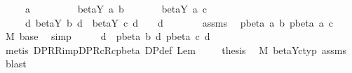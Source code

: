 \begin{isabellebody}
\ \ \ {\isachardoublequoteopen}{\isasymGamma}\ {\isasymturnstile}\ a\ {\isacharcolon}\ {\isasymsigma}{\isachardoublequoteclose}\isanewline
\ \ \ \ \ \ \ {\isachardoublequoteopen}beta{\isacharunderscore}Y{\isacharasterisk}\ a\ b{\isachardoublequoteclose}\isanewline
\ \ \ \ \ \ \ {\isachardoublequoteopen}beta{\isacharunderscore}Y{\isacharasterisk}\ a\ c{\isachardoublequoteclose}\isanewline
\ \ \ \ \ {\isachardoublequoteopen}{\isasymexists}d{\isachardot}\ beta{\isacharunderscore}Y{\isacharasterisk}\ b\ d\ {\isasymand}\ beta{\isacharunderscore}Y{\isacharasterisk}\ c\ d\ {\isasymand}\ {\isasymGamma}\ {\isasymturnstile}\ d\ {\isacharcolon}\ {\isasymsigma}{\isachardoublequoteclose}\isanewline
%
\isadelimproof
%
\endisadelimproof
%
\isatagproof
{}\isamarkupfalse%
\ {\isacharminus}\isanewline
\ \ \isamarkupfalse%
\ assms\ \isamarkupfalse%
\ {\isachardoublequoteopen}pbeta{\isacharasterisk}\ a\ b{\isachardoublequoteclose}\ {\isachardoublequoteopen}pbeta{\isacharasterisk}\ a\ c{\isachardoublequoteclose}\ \isamarkupfalse%
\ M{}\ base\ \isamarkupfalse%
\ simp{\isacharplus}\isanewline
\ \ \isamarkupfalse%
\ \isamarkupfalse%
\ d\ \ {\isachardoublequoteopen}pbeta{\isacharasterisk}\ b\ d{\isachardoublequoteclose}\ {\isachardoublequoteopen}pbeta{\isacharasterisk}\ c\ d{\isachardoublequoteclose}\ \isamarkupfalse%
\ {\isacharparenleft}metis\ DP{\isacharunderscore}R{\isacharunderscore}R{\isacharunderscore}imp{\isacharunderscore}DP{\isacharunderscore}Rc{\isacharunderscore}Rc{\isacharunderscore}pbeta\ DP{\isacharunderscore}def\ Lem{}{\isacharunderscore}{}{\isacharunderscore}{}{\isacharparenright}\ \isanewline
\ \ \isamarkupfalse%
\ {\isacharquery}thesis\ \isamarkupfalse%
\ M{}\ beta{\isacharunderscore}Y{\isacharunderscore}c{\isacharunderscore}typ\ assms\ \isamarkupfalse%
\ blast\isanewline
{}\isamarkupfalse%
%
\endisatagproof
{\isafoldproof}%
%
\isadelimproof
\isanewline
%
\endisadelimproof
%
\isadelimtheory
%
\endisadelimtheory
%
\isatagtheory
{}\isamarkupfalse%
%
\endisatagtheory
{\isafoldtheory}%
%
\isadelimtheory
%
\endisadelimtheory
%
\end{isabellebody}%
